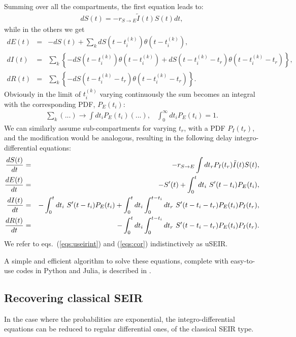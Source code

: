\documentclass[10pt,letterpaper]{article}
\begin{document}
Summing over all the compartments, the first equation leads to:
\begin{eqnarray}
d S(t) = - r_{S\rightarrow E} \tilde{I}(t) S(t) dt,
\end{eqnarray}
while in the others we get
\begin{eqnarray}
d E(t) &=& -d S(t) + \sum_k d S(t-t^{(k)}_i) \theta(t-t^{(k)}_i) ,\nonumber\\
d I(t) &=& \sum_k  \left\{-d S(t-t^{(k)}_i) \theta(t-t^{(k)}_i)+ d S(t-t^{(k)}_i-t_r) \theta(t-t^{(k)}_i-t_r)\right\},\nonumber\\
d R(t) &=& \sum_k \left\{- d S(t - t^{(k)}_i - t_r) \theta(t-t^{(k)}_i-t_r)\right\}.
\label{eqs:corint}
\end{eqnarray}
Obviously in the limit of $t_i^{(k)}$ varying continuously the sum becomes an integral with the corresponding PDF, $P_E(t_i)$:
\begin{eqnarray}
\sum_k  (...) \rightarrow \int dt_i P_E(t_i) (...), \;\;\; \int_0^\infty dt_i P_E(t_i) = 1.
\end{eqnarray}
We can similarly assume sub-compartments for varying $t_r$, with a PDF $P_I(t_r)$, and the modification would be analogous, resulting in the following delay integro-differential equations:
\begin{eqnarray}
{d S(t)\over dt} &=& - r_{S\rightarrow E} \int d t_r  P_I(t_r)\tilde{I}(t) S(t) ,\nonumber\\
{d E(t)\over dt} &=& - S'(t) + \int_0^{t} dt_i ~S'(t-t_i) P_E(t_i) ,\nonumber\\
{d I(t)\over dt} &=& -\int_0^{t} dt_i  ~S'(t-t_i) P_E(t_i) + \int_0^{t} d t_i \int_0^{t-t_i} dt_r~ S'(t-t_i-t_r) P_E(t_i) P_I(t_r),\nonumber\\
{d R(t)\over dt} &=& -\int_0^{t} d t_i \int_0^{t-t_i} dt_r~ S'(t-t_i-t_r) P_E(t_i) P_I(t_r).
\label{eqs:useirint}
\end{eqnarray}
We refer to eqs.~(\ref{eqs:useirint}) and (\ref{eqs:cor}) indistinctively as uSEIR.

A simple and efficient algorithm to solve these equations, complete with easy-to-use codes in Python and Julia, is described in .




\subsection*{Recovering classical SEIR}

In the case where the probabilities are exponential, the integro-differential equations can be reduced to regular differential ones, of the classical SEIR type.
\end{document}
